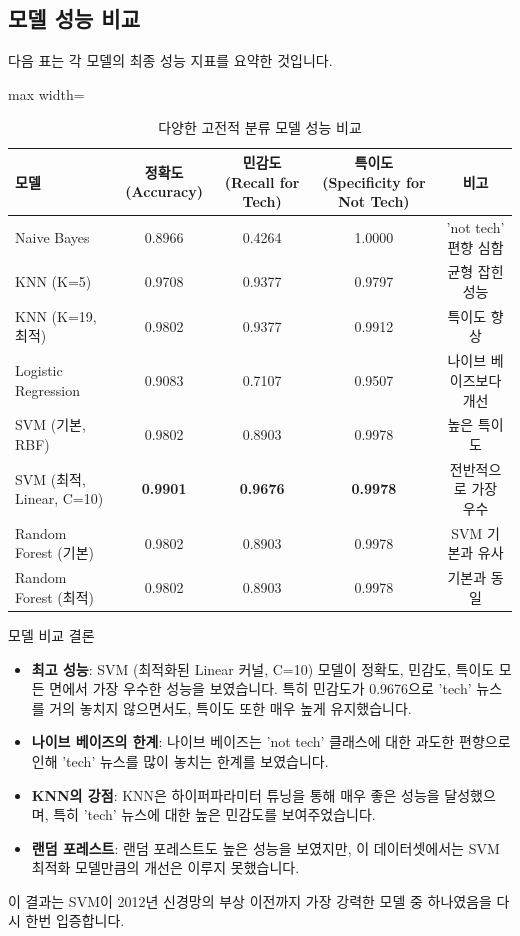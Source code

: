 \documentclass[11pt,a4paper]{article}
\begin{document}
\subsection{모델 성능 비교}

다음 표는 각 모델의 최종 성능 지표를 요약한 것입니다.

\begin{table}[h!]
\centering
\caption{다양한 고전적 분류 모델 성능 비교}
\label{tab:model_comparison}
\begin{adjustbox}{max width=\textwidth}
\begin{tabular}{lcccc}
\toprule
\textbf{모델} & \textbf{정확도 (Accuracy)} & \textbf{민감도 (Recall for Tech)} & \textbf{특이도 (Specificity for Not Tech)} & \textbf{비고} \\
\midrule
Naive Bayes & 0.8966 & 0.4264 & 1.0000 & 'not tech' 편향 심함 \\
KNN (K=5) & 0.9708 & 0.9377 & 0.9797 & 균형 잡힌 성능 \\
KNN (K=19, 최적) & 0.9802 & 0.9377 & 0.9912 & 특이도 향상 \\
Logistic Regression & 0.9083 & 0.7107 & 0.9507 & 나이브 베이즈보다 개선 \\
SVM (기본, RBF) & 0.9802 & 0.8903 & 0.9978 & 높은 특이도 \\
SVM (최적, Linear, C=10) & \textbf{0.9901} & \textbf{0.9676} & \textbf{0.9978} & 전반적으로 가장 우수 \\
Random Forest (기본) & 0.9802 & 0.8903 & 0.9978 & SVM 기본과 유사 \\
Random Forest (최적) & 0.9802 & 0.8903 & 0.9978 & 기본과 동일 \\
\bottomrule
\end{tabular}
\end{adjustbox}
\end{table}

\begin{infobox}{모델 비교 결론}
\begin{itemize}
    \item \textbf{최고 성능}: SVM (최적화된 Linear 커널, C=10) 모델이 정확도, 민감도, 특이도 모든 면에서 가장 우수한 성능을 보였습니다. 특히 민감도가 0.9676으로 'tech' 뉴스를 거의 놓치지 않으면서도, 특이도 또한 매우 높게 유지했습니다.
    \item \textbf{나이브 베이즈의 한계}: 나이브 베이즈는 'not tech' 클래스에 대한 과도한 편향으로 인해 'tech' 뉴스를 많이 놓치는 한계를 보였습니다.
    \item \textbf{KNN의 강점}: KNN은 하이퍼파라미터 튜닝을 통해 매우 좋은 성능을 달성했으며, 특히 'tech' 뉴스에 대한 높은 민감도를 보여주었습니다.
    \item \textbf{랜덤 포레스트}: 랜덤 포레스트도 높은 성능을 보였지만, 이 데이터셋에서는 SVM 최적화 모델만큼의 개선은 이루지 못했습니다.
\end{itemize}
이 결과는 SVM이 2012년 신경망의 부상 이전까지 가장 강력한 모델 중 하나였음을 다시 한번 입증합니다.
\end{infobox}
\end{document}

